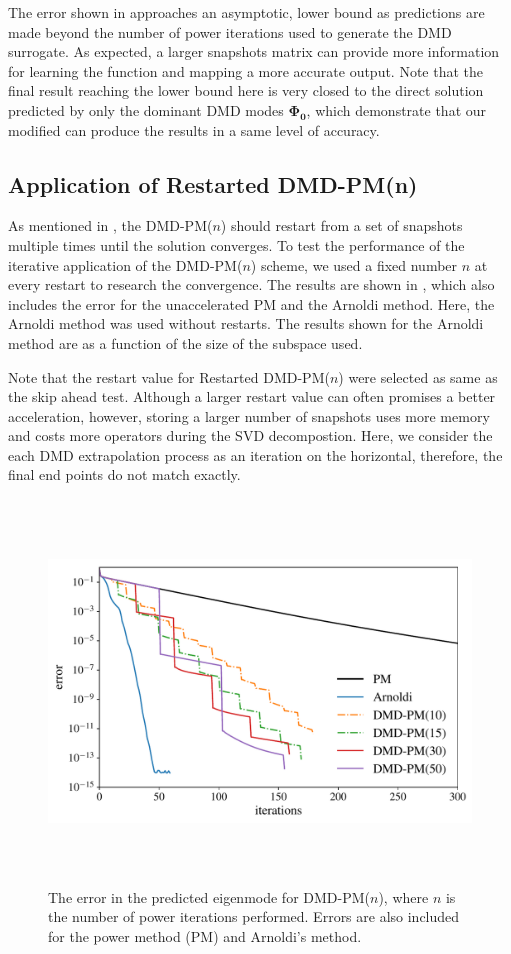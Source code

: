 The error shown in  approaches an asymptotic, lower bound as predictions are made beyond the number of power iterations used to generate the DMD surrogate.
As expected, a larger snapshots matrix can provide more information for learning the function and mapping a more accurate output.
Note that the final result reaching the lower bound here is very closed to the direct solution predicted by only the dominant DMD modes $\mathbf{\Phi_0}$, which demonstrate that our modified  can produce the results in a same level of accuracy.

\subsection{Application of Restarted DMD-PM(n)}
As mentioned in , the DMD-PM($n$) should restart from a set of snapshots multiple times until the solution converges.
To test the performance of the iterative application of the DMD-PM($n$) scheme, we used a fixed number $n$ at every restart to research the convergence.  
The results are shown in , which also includes the error for the unaccelerated PM and the Arnoldi method.
Here, the Arnoldi method was used without restarts. 
The results shown for the Arnoldi method are as a function of the size of the subspace used.

Note that the restart value for Restarted DMD-PM($n$) were selected as same as the skip ahead test.
Although a larger restart value can often promises a better acceleration, however, storing a larger number of snapshots uses more memory and costs more operators during the SVD decompostion.
Here, we consider the each DMD extrapolation process as an iteration on the horizontal, therefore, the final end points do not match exactly.

\begin{figure}[htb]%
    \centering
    \includegraphics[height=4.0in]{tex/figures/dmdpi_semilog.pdf}
    \caption{The error in the predicted eigenmode for DMD-PM($n$), where $n$ is the number of power iterations performed.  Errors are also included for the power method (PM) and Arnoldi's method.}
    \label{fig:dmdpi_semilog}
\end{figure}

